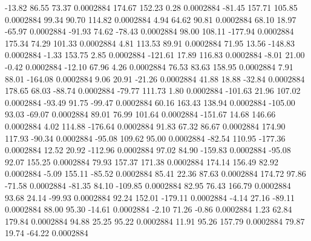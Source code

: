       -13.82       86.55       73.37     0.0002884
      174.67      152.23        0.28     0.0002884
      -81.45      157.71      105.85     0.0002884
       99.34       90.70      114.82     0.0002884
        4.94       64.62       90.81     0.0002884
       68.10       18.97      -65.97     0.0002884
      -91.93       74.62      -78.43     0.0002884
       98.00      108.11     -177.94     0.0002884
      175.34       74.29      101.33     0.0002884
        4.81      113.53       89.91     0.0002884
       71.95       13.56     -148.83     0.0002884
       -1.33      153.75        2.85     0.0002884
     -121.61       17.89      116.83     0.0002884
       -8.01       21.00       -0.42     0.0002884
      -12.10       67.96        4.26     0.0002884
       76.53       83.63      158.95     0.0002884
        7.91       88.01     -164.08     0.0002884
        9.06       20.91      -21.26     0.0002884
       41.88       18.88      -32.84     0.0002884
      178.65       68.03      -88.74     0.0002884
      -79.77      111.73        1.80     0.0002884
     -101.63       21.96      107.02     0.0002884
      -93.49       91.75      -99.47     0.0002884
       60.16      163.43      138.94     0.0002884
     -105.00       93.03      -69.07     0.0002884
       89.01       76.99      101.64     0.0002884
     -151.67       14.68      146.66     0.0002884
        4.02      114.88     -176.64     0.0002884
       91.83       67.32       86.67     0.0002884
      174.90      117.93      -90.34     0.0002884
      -95.08      109.62       95.00     0.0002884
      -82.54      110.95     -177.36     0.0002884
       12.52       20.92     -112.96     0.0002884
       97.02       84.90     -159.83     0.0002884
      -95.08       92.07      155.25     0.0002884
       79.93      157.37      171.38     0.0002884
      174.14      156.49       82.92     0.0002884
       -5.09      155.11      -85.52     0.0002884
       85.41       22.36       87.63     0.0002884
      174.72       97.86      -71.58     0.0002884
      -81.35       84.10     -109.85     0.0002884
       82.95       76.43      166.79     0.0002884
       93.68       24.14      -99.93     0.0002884
       92.24      152.01     -179.11     0.0002884
       -4.14       27.16      -89.11     0.0002884
       88.00       95.30      -14.61     0.0002884
       -2.10       71.26       -0.86     0.0002884
        1.23       62.84      179.84     0.0002884
       94.88       25.25       95.22     0.0002884
       11.91       95.26      157.79     0.0002884
       79.87       19.74      -64.22     0.0002884
